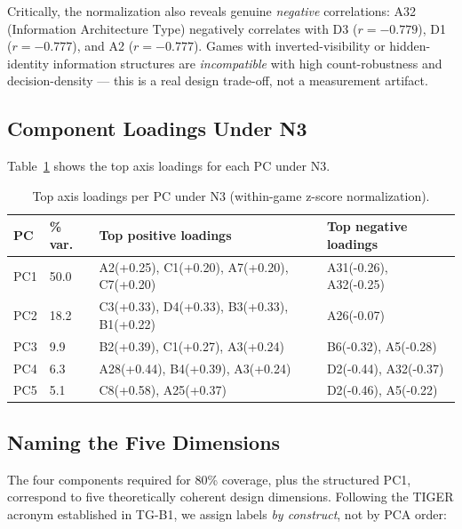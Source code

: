 Critically, the normalization also reveals genuine \emph{negative} correlations:
A32 (Information Architecture Type) negatively correlates with D3 ($r = -0.779$),
D1 ($r = -0.777$), and A2 ($r = -0.777$). Games with inverted-visibility or
hidden-identity information structures are \emph{incompatible} with high count-robustness
and decision-density — this is a real design trade-off, not a measurement artifact.

\subsection{Component Loadings Under N3}

Table~\ref{tab:loadings} shows the top axis loadings for each PC under N3.

\begin{table}[h]
\centering
\caption{Top axis loadings per PC under N3 (within-game z-score normalization).}
\label{tab:loadings}
\begin{tabular}{llll}
\toprule
\textbf{PC} & \textbf{\% var.} & \textbf{Top positive loadings} & \textbf{Top negative loadings} \\
\midrule
PC1 & 50.0 & A2(+0.25), C1(+0.20), A7(+0.20), C7(+0.20) & A31(-0.26), A32(-0.25) \\
PC2 & 18.2 & C3(+0.33), D4(+0.33), B3(+0.33), B1(+0.22) & A26(-0.07) \\
PC3 &  9.9 & B2(+0.39), C1(+0.27), A3(+0.24) & B6(-0.32), A5(-0.28) \\
PC4 &  6.3 & A28(+0.44), B4(+0.39), A3(+0.24) & D2(-0.44), A32(-0.37) \\
PC5 &  5.1 & C8(+0.58), A25(+0.37) & D2(-0.46), A5(-0.22) \\
\bottomrule
\end{tabular}
\end{table}

\subsection{Naming the Five Dimensions}

The four components required for 80\% coverage, plus the structured PC1, correspond to
five theoretically coherent design dimensions. Following the TIGER acronym established
in TG-B1, we assign labels \emph{by construct}, not by PCA order:

